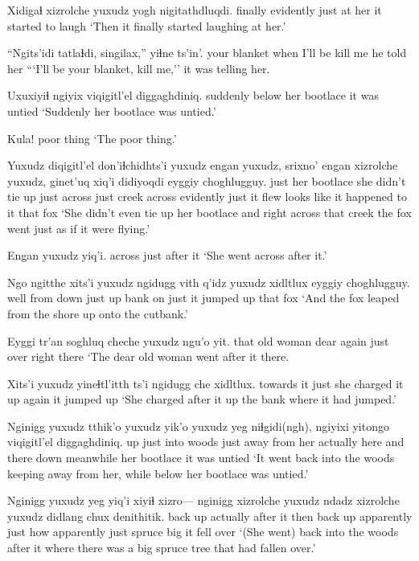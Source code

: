 \documentclass[12pt]{article}
\begin{document}
\gll Xidigaɬ xizrolche yuxudz yogh nigitathdluqdi.
finally evidently just {at her} {it started to laugh}
\glt `Then it finally started laughing at her.'
\glend

\gll ``Ngits'idi tatlaɬdi, singilax,'' yiɬne ts'in'.
{your blanket} {when I'll be} {kill me} {he told her} {}
\glt ```I'll be your blanket, kill me,'' it was telling her.
\glend

\gll Uxuxiyiɬ ngiyix viqigitl'el diggaghdiniq.
suddenly below {her bootlace} {it was untied}
\glt `Suddenly her bootlace was untied.'
\glend

\gll Kula!
{{poor thing}}
\glt `The poor thing.'
\glend

\gll Yuxudz diqigitl'el don'iɬchidhts'i yuxudz engan yuxudz, srixno' engan xizrolche yuxudz, ginet'uq xiq'i didiyoqdi eyggiy choghlugguy.
just {her bootlace} {she didn't tie up} just across just creek across evidently just {it flew} {looks like} {it happened to it} that fox
\glt `She didn't even tie up her bootlace and right across that creek the fox went just as if it were flying.'
\glend

\gll Engan yuxudz yiq'i.
across just {after it}
\glt `She went across after it.'
\glend

\gll Ngo {ngitthe xits'i} yuxudz ngidugg vith q'idz yuxudz xidltlux eyggiy choghlugguy.
well {from down} just up bank on just {it jumped up} that fox
\glt `And the fox leaped from the shore up onto the cutbank.'
\glend

\gll Eyggi tr'an soghluq cheche yuxudz {ngu'o yit.}
that {old woman} dear again just over {right there}
\glt `The dear old woman went after it there.
\glend

\gll Xits'i yuxudz yineɬtl'itth ts'i ngidugg che xidltlux.
{towards it} just {she charged it} {} up again {it jumped up}
\glt `She charged after it up the bank where it had jumped.'
\glend

\gll Nginigg yuxudz tthik'o yuxudz yik'o {yuxudz yeg} niɬgidi(ngh), ngiyixi yitongo viqigitl'el diggaghdiniq.
up just {into woods} just {away from her} actually {here and there} down meanwhile {her bootlace} {it was untied}
\glt `It went back into the woods keeping away from her, while below her bootlace was untied.'
\glend

\gll Nginigg {yuxudz yeg} yiq'i xiyiɬ xizro--- nginigg xizrolche yuxudz ndadz xizrolche yuxudz didlang chux denithitik. 
{back up} actually {after it} then {} {back up} apparently just how apparently just spruce big {it fell over}
\glt `(She went) back into the woods after it where there was a big spruce tree that had fallen over.'
\glend
\end{document}
